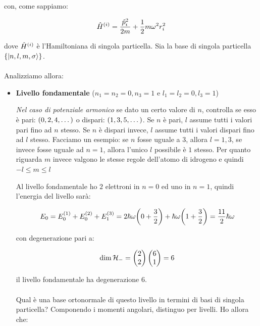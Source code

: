	con, come sappiamo:
	
\begin{align*}
	\hat{H}^{\qty(i)} = \frac{\hat{p}^2_i}{2m} + \frac{1}{2} m \omega^2 r^2_i
\end{align*}

	dove $\hat{H}^{\qty(i)}$ è l'Hamiltoniana di singola particella. Sia la base di singola particella $\qty{\ket{n, l, m, \sigma}}$.
	\\
	\\
	Analizziamo allora:
	
\begin{itemize}

	\item \textbf{Livello fondamentale} ($n_1 = n_2 = 0, n_3 = 1$ e $l_1 = l_2 = 0, l_3 = 1$)
	
	\begin{myapprf}
		\textit{Nel caso di potenziale armonico} se dato un certo valore di $n$, controlla se esso è pari: $\qty(0, 2, 4, \dots)$ o dispari: $\qty(1, 3, 5, \dots)$. Se $n$ è pari, $l$ assume tutti i valori pari fino ad $n$ stesso. Se $n$ è dispari invece, $l$ assume tutti i valori dispari fino ad $l$ stesso. Facciamo un esempio: se $n$ fosse uguale a $3$, allora $l = 1, 3$, se invece fosse uguale ad $n = 1$, allora l'unico $l$ possibile è $1$ stesso. Per quanto riguarda $m$ invece valgono le stesse regole dell'atomo di idrogeno e quindi $-l \leq m \leq l$
	\end{myapprf}

	
		Al livello fondamentale ho $2$ elettroni in $n = 0$ ed uno in $n = 1$, quindi l'energia del livello sarà:
		
	\begin{align*}
		E_0 = E_0^{\qty(1)} + E_0^{\qty(2)} + E_1^{\qty(3)} = 2 \hbar \omega \qty(0 + \frac{3}{2}) + \hbar \omega \qty( 1 + \frac{3}{2}) = \frac{11}{2} \hbar \omega
	\end{align*}

		con degenerazione pari a:
		
	\begin{align*}
		\text{dim} \, \mathcal{H}_- = \mqty(2 \\ 2) \, \mqty(6 \\ 1) = 6
	\end{align*}

		il livello fondamentale ha degenerazione $6$.
		\\
		\\
		Qual è una base ortonormale di questo livello in termini di basi di singola particella? Componendo i momenti angolari, distinguo per livelli. Ho allora che:
		

\end{itemize}
